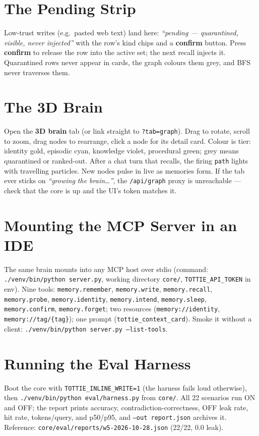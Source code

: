 \section{The Pending Strip}
Low-trust writes (e.g.\ pasted web text) land here: \emph{``pending --- quarantined,
visible, never injected''} with the row's kind chips and a \textbf{confirm} button. Press
\textbf{confirm} to release the row into the active set; the next recall injects it.
Quarantined rows never appear in cards, the graph colours them grey, and BFS never
traverses them.

\section{The 3D Brain}
Open the \textbf{3D brain} tab (or link straight to \texttt{?tab=graph}). Drag to rotate,
scroll to zoom, drag nodes to rearrange, click a node for its detail card. Colour is tier:
identity gold, episodic cyan, knowledge violet, procedural green; grey means quarantined
or ranked-out. After a chat turn that recalls, the firing \texttt{path} lights with
travelling particles. New nodes pulse in live as memories form. If the tab ever sticks on
\emph{``growing the brain\ldots''}, the \texttt{/api/graph} proxy is unreachable --- check
that the core is up and the UI's token matches it.

\section{Mounting the MCP Server in an IDE}
The same brain mounts into any MCP host over stdio (command:
\texttt{./venv/bin/python server.py}, working directory \texttt{core/},
\texttt{TOTTIE\_API\_TOKEN} in env). Nine tools: \texttt{memory.remember},
\texttt{memory.write}, \texttt{memory.recall}, \texttt{memory.probe},
\texttt{memory.identity}, \texttt{memory.intend}, \texttt{memory.sleep},
\texttt{memory.confirm}, \texttt{memory.forget}; two resources
(\texttt{memory://identity}, \texttt{memory://tag/\{tag\}}); one prompt
(\texttt{tottie\_context\_card}). Smoke it without a client:
\texttt{./venv/bin/python server.py --list-tools}.

\section{Running the Eval Harness}
Boot the core with \texttt{TOTTIE\_INLINE\_WRITE=1} (the harness fails loud otherwise),
then \texttt{./venv/bin/python eval/harness.py} from \texttt{core/}. All 22 scenarios run
ON and OFF; the report prints accuracy, contradiction-correctness, OFF leak rate, hit
rate, tokens/query, and p50/p95, and \texttt{--out report.json} archives it. Reference:
\texttt{core/eval/reports/w5-2026-10-28.json} (22/22, 0.0 leak).

